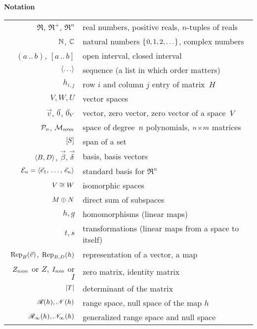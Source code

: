 \thispagestyle{empty}
\begin{center}
  \textbf{Notation}  \\[2ex]
  \begin{tabular}{r|l}
    \( \Re \), \( \Re^+ \), \( \Re^n \) &real numbers, positive reals, $n$-tuples of reals \\
    \( \N              \),
    \( \C              \)  &natural numbers \( \set{0,1,2,\ldots} \), complex numbers                           \\
    \( (a\,..\,b) \), \( [a\,..\,b] \) &open interval, closed interval   \\
    \( \sequence{\ldots} \)&sequence (a list in which order matters)    \\
    \( h_{i,j} \)          &row \( i \) and column \( j \) entry of matrix~$H$ \\
    \( V,W,U \)            &vector spaces               \\
    \( \vec{v} \),
    $\zero$, $\zero_V$     &vector, zero vector, zero vector of a space~$V$   \\
    \( \polyspace_n \), \( \matspace_{\nbym{n}{m}} \)  
                          &space of degree~\( n \) polynomials, \( \nbym{n}{m} \) matrices      \\
    \( \spanof{S} \)       &span of a set                   \\
    \( \sequence{B,D} \), \( \vec{\beta},\vec{\delta} \)         
                          &basis, basis vectors  \\
    \( \stdbasis_n=\sequence{\vec{e}_1,\,\ldots,\,\vec{e}_n} \)         
                          &standard basis for $\Re^n$  \\
    \( V\isomorphicto W \) &isomorphic spaces                         \\
    \( M\directsum N \)    &direct sum of subspaces                   \\
    \( h,g \)              &homomorphisms (linear maps)                \\
    \( t,s \)              &transformations (linear maps from a space to itself) \\
    \( \rep{\vec{v}}{B} \), \( \rep{h}{B,D} \)     
                          &representation of a vector, a map    \\
    \( Z_{\nbym{n}{m}} \) or \( Z \), \(I_{\nbyn{n}}\) or \( I \)  &zero matrix, identity matrix    \\
    \( \deter{T} \)        &determinant of the matrix       \\
    \( \rangespace{h},\nullspace{h} \)
                           &range space,  null space of the map \( h \) \\
    \( \genrangespace{h},\gennullspace{h} \)
                           &generalized range space and null space
  \end{tabular}
\end{center}
